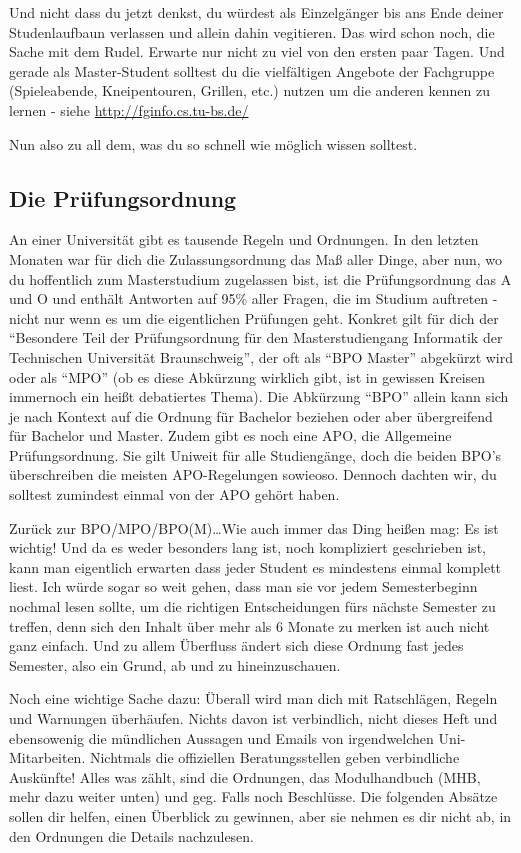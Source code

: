Und nicht dass du jetzt denkst, du würdest als Einzelgänger bis ans Ende deiner Studenlaufbaun verlassen und allein dahin vegitieren. Das wird schon noch, die Sache mit dem Rudel. Erwarte nur nicht zu viel von den ersten paar Tagen. Und gerade als Master-Student solltest du die vielfältigen Angebote der Fachgruppe (Spieleabende, Kneipentouren, Grillen, etc.) nutzen um die anderen kennen zu lernen - siehe \url{http://fginfo.cs.tu-bs.de/}

Nun also zu all dem, was du so schnell wie möglich wissen solltest.

\subsection{Die Prüfungsordnung}
An einer Universität gibt es tausende Regeln und Ordnungen. In den letzten Monaten war für dich die Zulassungsordnung das Maß aller Dinge, aber nun, wo du hoffentlich zum Masterstudium zugelassen bist, ist die Prüfungsordnung das A und O und enthält Antworten auf 95\% aller Fragen, die im Studium auftreten - nicht nur wenn es um die eigentlichen Prüfungen geht. Konkret gilt für dich der "`Besondere Teil der Prüfungsordnung für den Masterstudiengang Informatik der Technischen Universität Braunschweig"', der oft als "`BPO Master"' abgekürzt wird oder als "`MPO"' (ob es diese Abkürzung wirklich gibt, ist in gewissen Kreisen immernoch ein heißt debatiertes Thema). Die Abkürzung "`BPO"' allein kann sich je nach Kontext auf die Ordnung für Bachelor beziehen oder aber übergreifend für Bachelor und Master. Zudem gibt es noch eine APO, die Allgemeine Prüfungsordnung. Sie gilt Uniweit für alle Studiengänge, doch die beiden BPO's überschreiben die meisten APO-Regelungen sowieoso. Dennoch dachten wir, du solltest zumindest einmal von der APO gehört haben.

Zurück zur BPO/MPO/BPO(M)\ldots Wie auch immer das Ding heißen mag: Es ist wichtig! Und da es weder besonders lang ist, noch kompliziert geschrieben ist, kann man eigentlich erwarten dass jeder Student es mindestens einmal komplett liest. Ich würde sogar so weit gehen, dass man sie vor jedem Semesterbeginn nochmal lesen sollte, um die richtigen Entscheidungen fürs nächste Semester zu treffen, denn sich den Inhalt über mehr als 6 Monate zu merken ist auch nicht ganz einfach. Und zu allem Überfluss ändert sich diese Ordnung fast jedes Semester, also ein Grund, ab und zu hineinzuschauen.

Noch eine wichtige Sache dazu: Überall wird man dich mit Ratschlägen, Regeln und Warnungen überhäufen. Nichts davon ist verbindlich, nicht dieses Heft und ebensowenig die mündlichen Aussagen und Emails von irgendwelchen Uni-Mitarbeiten. Nichtmals die offiziellen Beratungsstellen geben verbindliche Auskünfte! Alles was zählt, sind die Ordnungen, das Modulhandbuch (MHB, mehr dazu weiter unten) und geg. Falls noch Beschlüsse. Die folgenden Absätze sollen dir helfen, einen Überblick zu gewinnen, aber sie nehmen es dir nicht ab, in den Ordnungen die Details nachzulesen.

